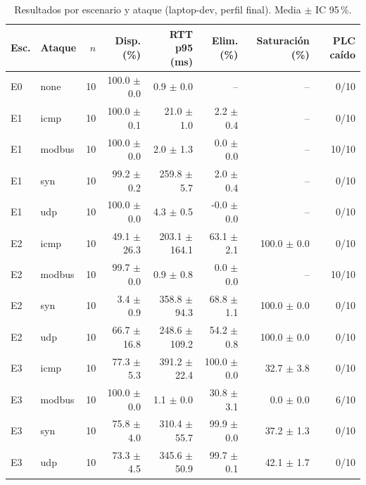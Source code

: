 \begin{table}[htbp]
\centering
\caption{Resultados por escenario y ataque (laptop-dev, perfil final). Media $\pm$ IC 95\,\%.}
\label{tab:stats-laptop-dev-final}
\scriptsize
\begin{tabular}{l l r r r r r r}
\toprule
Esc. & Ataque & $n$ & Disp. (\%) & RTT p95 (ms) & Elim. (\%) & Saturación (\%) & PLC caído \\
\midrule
E0 & none & 10 & 100.0 $\pm$ 0.0 & 0.9 $\pm$ 0.0 & -- & -- & 0/10 \\
E1 & icmp & 10 & 100.0 $\pm$ 0.1 & 21.0 $\pm$ 1.0 & 2.2 $\pm$ 0.4 & -- & 0/10 \\
E1 & modbus & 10 & 100.0 $\pm$ 0.0 & 2.0 $\pm$ 1.3 & 0.0 $\pm$ 0.0 & -- & 10/10 \\
E1 & syn & 10 & 99.2 $\pm$ 0.2 & 259.8 $\pm$ 5.7 & 2.0 $\pm$ 0.4 & -- & 0/10 \\
E1 & udp & 10 & 100.0 $\pm$ 0.0 & 4.3 $\pm$ 0.5 & -0.0 $\pm$ 0.0 & -- & 0/10 \\
E2 & icmp & 10 & 49.1 $\pm$ 26.3 & 203.1 $\pm$ 164.1 & 63.1 $\pm$ 2.1 & 100.0 $\pm$ 0.0 & 0/10 \\
E2 & modbus & 10 & 99.7 $\pm$ 0.0 & 0.9 $\pm$ 0.8 & 0.0 $\pm$ 0.0 & -- & 10/10 \\
E2 & syn & 10 & 3.4 $\pm$ 0.9 & 358.8 $\pm$ 94.3 & 68.8 $\pm$ 1.1 & 100.0 $\pm$ 0.0 & 0/10 \\
E2 & udp & 10 & 66.7 $\pm$ 16.8 & 248.6 $\pm$ 109.2 & 54.2 $\pm$ 0.8 & 100.0 $\pm$ 0.0 & 0/10 \\
E3 & icmp & 10 & 77.3 $\pm$ 5.3 & 391.2 $\pm$ 22.4 & 100.0 $\pm$ 0.0 & 32.7 $\pm$ 3.8 & 0/10 \\
E3 & modbus & 10 & 100.0 $\pm$ 0.0 & 1.1 $\pm$ 0.0 & 30.8 $\pm$ 3.1 & 0.0 $\pm$ 0.0 & 6/10 \\
E3 & syn & 10 & 75.8 $\pm$ 4.0 & 310.4 $\pm$ 55.7 & 99.9 $\pm$ 0.0 & 37.2 $\pm$ 1.3 & 0/10 \\
E3 & udp & 10 & 73.3 $\pm$ 4.5 & 345.6 $\pm$ 50.9 & 99.7 $\pm$ 0.1 & 42.1 $\pm$ 1.7 & 0/10 \\
\bottomrule
\end{tabular}
\end{table}
